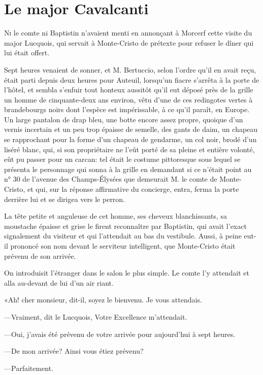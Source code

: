 \chapter{Le major Cavalcanti}

\lettrine{N}{i} le comte ni Baptistin n'avaient menti en annonçant à Morcerf cette visite du major Lucquois, qui servait à Monte-Cristo de prétexte pour refuser le dîner qui lui était offert. 

\zz
Sept heures venaient de sonner, et M. Bertuccio, selon l'ordre qu'il en avait reçu, était parti depuis deux heures pour Auteuil, lorsqu'un fiacre s'arrêta à la porte de l'hôtel, et sembla s'enfuir tout honteux aussitôt qu'il eut déposé près de la grille un homme de cinquante-deux ans environ, vêtu d'une de ces redingotes vertes à brandebourgs noirs dont l'espèce est impérissable, à ce qu'il paraît, en Europe. Un large pantalon de drap bleu, une botte encore assez propre, quoique d'un vernis incertain et un peu trop épaisse de semelle, des gants de daim, un chapeau se rapprochant pour la forme d'un chapeau de gendarme, un col noir, brodé d'un liséré blanc, qui, si son propriétaire ne l'eût porté de sa pleine et entière volonté, eût pu passer pour un carcan: tel était le costume pittoresque sous lequel se présenta le personnage qui sonna à la grille en demandant si ce n'était point au n° 30 de l'avenue des Champs-Élysées que demeurait M. le comte de Monte-Cristo, et qui, sur la réponse affirmative du concierge, entra, ferma la porte derrière lui et se dirigea vers le perron. 

La tête petite et anguleuse de cet homme, ses cheveux blanchissants, sa moustache épaisse et grise le firent reconnaître par Baptistin, qui avait l'exact signalement du visiteur et qui l'attendait au bas du vestibule. Aussi, à peine eut-il prononcé son nom devant le serviteur intelligent, que Monte-Cristo était prévenu de son arrivée. 

On introduisit l'étranger dans le salon le plus simple. Le comte l'y attendait et alla au-devant de lui d'un air riant. 

«Ah! cher monsieur, dit-il, soyez le bienvenu. Je vous attendais. 

—Vraiment, dit le Lucquois, Votre Excellence m'attendait. 

—Oui, j'avais été prévenu de votre arrivée pour aujourd'hui à sept heures. 

—De mon arrivée? Ainsi vous étiez prévenu? 

—Parfaitement. 

